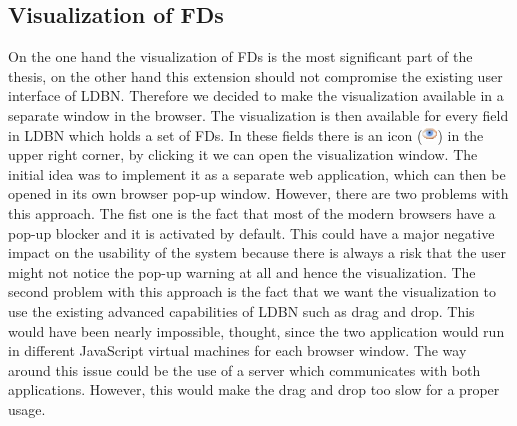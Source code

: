 \subsection{Visualization of FDs}
\label{sec:visualization}
On the one hand the visualization of FDs is the most significant 
part of the thesis, 
on the other hand this extension should not compromise the existing 
user interface of LDBN. Therefore we decided to
make the visualization available in a separate window in the browser. 
The visualization is then available for every field in LDBN which 
holds a set of FDs. In these fields there is an 
icon (\includegraphics[scale=0.6]{./img/eye.png}) in the upper right
corner, by clicking it we can open the visualization window.
The initial idea
was to implement it as a separate web application, which can then be 
opened in its own 
browser pop-up window. However, there are two problems with this approach. The fist one is
the fact that most of the modern browsers have a pop-up blocker and it is activated by default.
This could have a major negative impact on the usability of the system because there
is always a risk that the user might not notice the pop-up 
warning at all and hence the visualization. The second problem with this approach is 
the fact that we want the visualization to use the existing 
advanced capabilities of LDBN such as drag and drop. This would have been nearly impossible, thought, since
the two application would run in different JavaScript virtual machines for each
browser window. The way around this issue could be the use of a server
which communicates with both applications. However, 
this would make the drag and drop too slow for a proper usage. 

